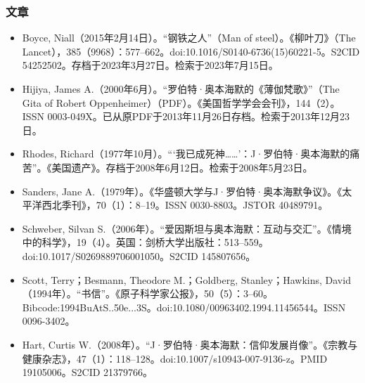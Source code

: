 \subsubsection{文章}
\begin{itemize}
\item Boyce, Niall（2015年2月14日）。“钢铁之人”（Man of steel）。《柳叶刀》（The Lancet），385（9968）：577–662。doi:10.1016/S0140-6736(15)60221-5。S2CID 54252502。存档于2023年3月27日。检索于2023年7月15日。
\item Hijiya, James A.（2000年6月）。“罗伯特·奥本海默的《薄伽梵歌》”（The Gita of Robert Oppenheimer）（PDF）。《美国哲学学会会刊》，144（2）。ISSN 0003-049X。已从原PDF于2013年11月26日存档。检索于2013年12月23日。
\item Rhodes, Richard（1977年10月）。“‘我已成死神……’：J·罗伯特·奥本海默的痛苦”。《美国遗产》。存档于2008年6月12日。检索于2008年5月23日。
\item Sanders, Jane A.（1979年）。《华盛顿大学与J·罗伯特·奥本海默争议》。《太平洋西北季刊》，70（1）：8–19。ISSN 0030-8803。JSTOR 40489791。
\item Schweber, Silvan S.（2006年）。“爱因斯坦与奥本海默：互动与交汇”。《情境中的科学》，19（4）。英国：剑桥大学出版社：513–559。doi:10.1017/S0269889706001050。S2CID 145807656。
\item Scott, Terry；Besmann, Theodore M.；Goldberg, Stanley；Hawkins, David（1994年）。“书信”。《原子科学家公报》，50（5）：3–60。Bibcode:1994BuAtS..50e...3S。doi:10.1080/00963402.1994.11456544。ISSN 0096-3402。
\item Hart, Curtis W.（2008年）。“J·罗伯特·奥本海默：信仰发展肖像”。《宗教与健康杂志》，47（1）：118–128。doi:10.1007/s10943-007-9136-z。PMID 19105006。S2CID 21379766。
\end{itemize}